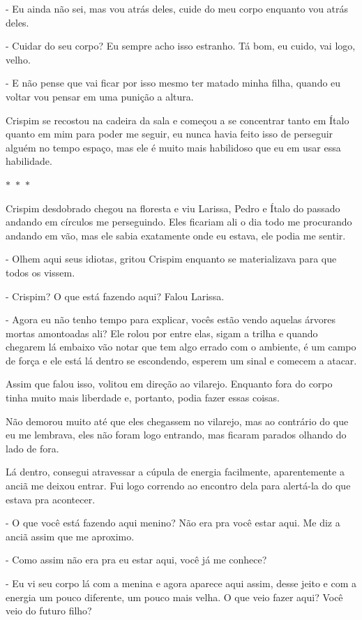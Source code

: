 - Eu ainda não sei, mas vou atrás deles, cuide do meu corpo enquanto vou atrás deles.

- Cuidar do seu corpo? Eu sempre acho isso estranho. Tá bom, eu cuido, vai logo, velho.

- E não pense que vai ficar por isso mesmo ter matado minha filha, quando eu voltar vou pensar em uma punição a altura.

Crispim se recostou na cadeira da sala e começou a se concentrar tanto em Ítalo quanto em mim para poder me seguir, eu nunca havia feito isso de perseguir alguém no tempo espaço, mas ele é muito mais habilidoso que eu em usar essa habilidade.

\begin{center}
  $\ast$~$\ast$~$\ast$
\end{center}
  
Crispim desdobrado chegou na floresta e viu Larissa, Pedro e Ítalo do passado andando em círculos me perseguindo. Eles ficariam ali o dia todo me procurando andando em vão, mas ele sabia exatamente onde eu estava, ele podia me sentir.

- Olhem aqui seus idiotas, gritou Crispim enquanto se materializava para que todos os vissem. 

- Crispim? O que está fazendo aqui? Falou Larissa.

- Agora eu não tenho tempo para explicar, vocês estão vendo aquelas árvores mortas amontoadas ali? Ele rolou por entre elas, sigam a trilha e quando chegarem lá embaixo vão notar que tem algo errado com o ambiente, é um campo de força e ele está lá dentro se escondendo, esperem um sinal e comecem a atacar.

Assim que falou isso, volitou em direção ao vilarejo. Enquanto fora do corpo tinha muito mais liberdade e, portanto, podia fazer essas coisas.

Não demorou muito até que eles chegassem no vilarejo, mas ao contrário do que eu me lembrava, eles não foram logo entrando, mas ficaram parados olhando do lado de fora.

Lá dentro, consegui atravessar a cúpula de energia facilmente, aparentemente a anciã me deixou entrar. Fui logo correndo ao encontro dela para alertá-la do que estava pra acontecer.

- O que você está fazendo aqui menino? Não era pra você estar aqui. Me diz a anciã assim que me aproximo.

- Como assim não era pra eu estar aqui, você já me conhece?

- Eu vi seu corpo lá com a menina e agora aparece aqui assim, desse jeito e com a energia um pouco diferente, um pouco mais velha. O que veio fazer aqui? Você veio do futuro filho?

